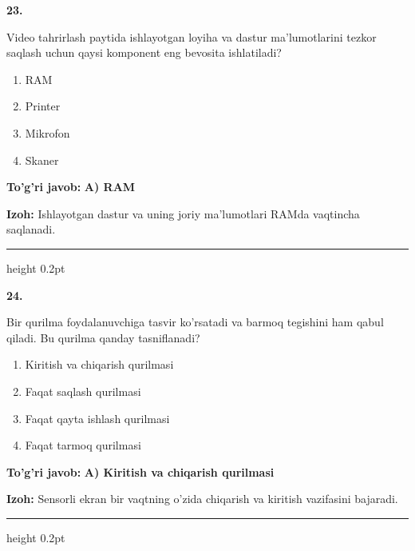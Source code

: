 \documentclass[10pt,a4paper]{article}
\begin{document}
{\bfseries\sffamily\color{ink} 23.}
\par
Video tahrirlash paytida ishlayotgan loyiha va dastur ma'lumotlarini tezkor saqlash uchun qaysi komponent eng bevosita ishlatiladi?
\begin{enumerate}[label=\Alph*),leftmargin=9mm]
\item RAM
\item Printer
\item Mikrofon
\item Skaner
\end{enumerate}
\begin{tcolorbox}[enhanced,breakable,colback=teal!4,colframe=teal!60!black,boxrule=0.45pt,arc=1.2mm,left=2.7mm,right=2.7mm,top=1.8mm,bottom=1.8mm,before skip=2mm,after skip=2mm]
{\bfseries\sffamily\color{teal}To'g'ri javob:} \textbf{A) RAM}
\par\smallskip
{\bfseries Izoh:} Ishlayotgan dastur va uning joriy ma'lumotlari RAMda vaqtincha saqlanadi.
\end{tcolorbox}
\vspace{2mm}\hrule height 0.2pt\vspace{3mm}

{\bfseries\sffamily\color{ink} 24.}
\par
Bir qurilma foydalanuvchiga tasvir ko'rsatadi va barmoq tegishini ham qabul qiladi. Bu qurilma qanday tasniflanadi?
\begin{enumerate}[label=\Alph*),leftmargin=9mm]
\item Kiritish va chiqarish qurilmasi
\item Faqat saqlash qurilmasi
\item Faqat qayta ishlash qurilmasi
\item Faqat tarmoq qurilmasi
\end{enumerate}
\begin{tcolorbox}[enhanced,breakable,colback=teal!4,colframe=teal!60!black,boxrule=0.45pt,arc=1.2mm,left=2.7mm,right=2.7mm,top=1.8mm,bottom=1.8mm,before skip=2mm,after skip=2mm]
{\bfseries\sffamily\color{teal}To'g'ri javob:} \textbf{A) Kiritish va chiqarish qurilmasi}
\par\smallskip
{\bfseries Izoh:} Sensorli ekran bir vaqtning o'zida chiqarish va kiritish vazifasini bajaradi.
\end{tcolorbox}
\vspace{2mm}\hrule height 0.2pt\vspace{3mm}
\end{document}
